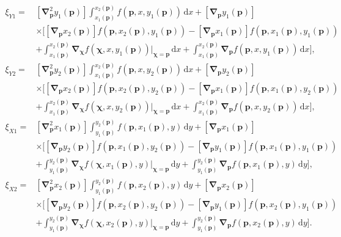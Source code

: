 \documentclass{article}
\begin{document}
\begin{equation}
  \begin{split}
    \xi_{Y1} =& \left[ \bm\nabla_{\bm p}^2 y_1(\bm p) \right] \int_{x_1(\bm p)}^{x_2(\bm p)} f(\bm p, x, y_1(\bm p)) \,\mathrm{d}x + \left[ \bm\nabla_{\bm p} y_1(\bm p) \right] \\
    & \times \bigg[ \left[ \bm\nabla_{\bm p} x_2(\bm p) \right] f(\bm p, x_2(\bm p), y_1(\bm p)) - \left[ \bm\nabla_{\bm p} x_1(\bm p) \right] f(\bm p, x_1(\bm p), y_1(\bm p)) \\
  &+ \int_{x_1(\bm p)}^{x_2(\bm p)} \bm\nabla_{\bm\chi} f(\bm\chi, x, y_1(\bm p))|_{\bm\chi = \bm p} \,\mathrm{d}x + \int_{x_1(\bm p)}^{x_2(\bm p)} \bm\nabla_{\bm p} f(\bm p, x, y_1(\bm p)) \,\mathrm{d}x \bigg], \\
    \xi_{Y2} =& \left[ \bm\nabla_{\bm p}^2 y_2(\bm p) \right] \int_{x_1(\bm p)}^{x_2(\bm p)} f(\bm p, x, y_2(\bm p)) \,\mathrm{d}x + \left[ \bm\nabla_{\bm p} y_2(\bm p) \right] \\
    & \times \bigg[ \left[ \bm\nabla_{\bm p} x_2(\bm p) \right] f(\bm p, x_2(\bm p), y_2(\bm p)) - \left[ \bm\nabla_{\bm p} x_1(\bm p) \right] f(\bm p, x_1(\bm p), y_2(\bm p)) \\
    &+ \int_{x_1(\bm p)}^{x_2(\bm p)} \bm\nabla_{\bm\chi} f(\bm\chi, x, y_2(\bm p))|_{\bm\chi = \bm p} \,\mathrm{d}x + \int_{x_1(\bm p)}^{x_2(\bm p)} \bm\nabla_{\bm p} f(\bm p, x, y_2(\bm p)) \,\mathrm{d}x \bigg], \\
    \xi_{X1} =& \left[ \bm\nabla_{\bm p}^2 x_1(\bm p) \right] \int_{y_1(\bm p)}^{y_2(\bm p)} f(\bm p, x_1(\bm p), y) \,\mathrm{d}y + \left[ \bm\nabla_{\bm p} x_1(\bm p) \right] \\
    & \times \bigg[ \left[ \bm\nabla_{\bm p} y_2(\bm p) \right] f(\bm p, x_1(\bm p), y_2(\bm p)) - \left[ \bm\nabla_{\bm p} y_1(\bm p) \right] f(\bm p, x_1(\bm p), y_1(\bm p)) \\
    &+ \int_{y_1(\bm p)}^{y_2(\bm p)} \bm\nabla_{\bm\chi} f(\bm\chi, x_1(\bm p), y)|_{\bm\chi = \bm p} \,\mathrm{d}y + \int_{y_1(\bm p)}^{y_2(\bm p)} \bm\nabla_{\bm p} f(\bm p, x_1(\bm p), y) \,\mathrm{d}y \bigg], \\
    \xi_{X2} =& \left[ \bm\nabla_{\bm p}^2 x_2(\bm p) \right] \int_{y_1(\bm p)}^{y_2(\bm p)} f(\bm p, x_2(\bm p), y) \,\mathrm{d}y + \left[ \bm\nabla_{\bm p} x_2(\bm p) \right] \\
    & \times \bigg[ \left[ \bm\nabla_{\bm p} y_2(\bm p) \right] f(\bm p, x_2(\bm p), y_2(\bm p)) - \left[ \bm\nabla_{\bm p} y_1(\bm p) \right] f(\bm p, x_2(\bm p), y_1(\bm p)) \\
    &+ \int_{y_1(\bm p)}^{y_2(\bm p)} \bm\nabla_{\bm\chi} f(\bm\chi, x_2(\bm p), y)|_{\bm\chi = \bm p} \,\mathrm{d}y + \int_{y_1(\bm p)}^{y_2(\bm p)} \bm\nabla_{\bm p} f(\bm p, x_2(\bm p), y) \,\mathrm{d}y \bigg].
  \end{split}
\end{equation}
\end{document}
